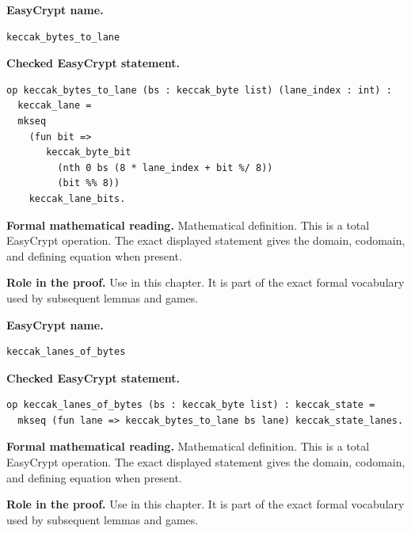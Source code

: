 \begin{formaldefinition}
\noindent\textbf{EasyCrypt name.}
\begin{lstlisting}[language=EasyCrypt,basicstyle=\ttfamily\scriptsize]
keccak_bytes_to_lane
\end{lstlisting}
\noindent\textbf{Checked EasyCrypt statement.}
\begin{lstlisting}[language=EasyCrypt,basicstyle=\ttfamily\scriptsize]
op keccak_bytes_to_lane (bs : keccak_byte list) (lane_index : int) :
  keccak_lane =
  mkseq
    (fun bit =>
       keccak_byte_bit
         (nth 0 bs (8 * lane_index + bit %/ 8))
         (bit %% 8))
    keccak_lane_bits.
\end{lstlisting}
\noindent\textbf{Formal mathematical reading.}
Mathematical definition. This is a total EasyCrypt operation.  The exact displayed statement gives the domain, codomain, and defining equation when present.

\noindent\textbf{Role in the proof.}
Use in this chapter. It is part of the exact formal vocabulary used by subsequent lemmas and games.

\end{formaldefinition}

\begin{formaldefinition}
\noindent\textbf{EasyCrypt name.}
\begin{lstlisting}[language=EasyCrypt,basicstyle=\ttfamily\scriptsize]
keccak_lanes_of_bytes
\end{lstlisting}
\noindent\textbf{Checked EasyCrypt statement.}
\begin{lstlisting}[language=EasyCrypt,basicstyle=\ttfamily\scriptsize]
op keccak_lanes_of_bytes (bs : keccak_byte list) : keccak_state =
  mkseq (fun lane => keccak_bytes_to_lane bs lane) keccak_state_lanes.
\end{lstlisting}
\noindent\textbf{Formal mathematical reading.}
Mathematical definition. This is a total EasyCrypt operation.  The exact displayed statement gives the domain, codomain, and defining equation when present.

\noindent\textbf{Role in the proof.}
Use in this chapter. It is part of the exact formal vocabulary used by subsequent lemmas and games.

\end{formaldefinition}

